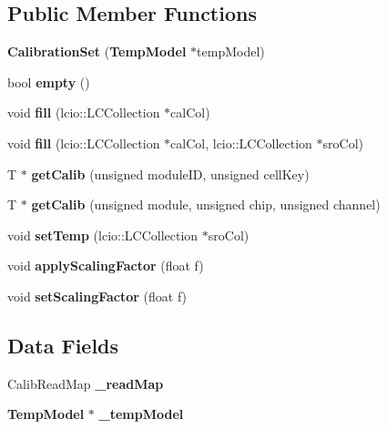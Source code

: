 \subsection*{Public Member Functions}
\begin{DoxyCompactItemize}
\item 
{\bfseries Calibration\-Set} ({\bf Temp\-Model} $\ast$temp\-Model)\label{classCALICE_1_1CalibrationSet_a5b3dc2a9fee4bb05ead1f6aecb63e508}

\item 
bool {\bfseries empty} ()\label{classCALICE_1_1CalibrationSet_acf72ce0c2908ad7c57c1a4fed2e0ae69}

\item 
void {\bfseries fill} (lcio\-::\-L\-C\-Collection $\ast$cal\-Col)\label{classCALICE_1_1CalibrationSet_af6eada4b282e59cd26830121ffe431ad}

\item 
void {\bfseries fill} (lcio\-::\-L\-C\-Collection $\ast$cal\-Col, lcio\-::\-L\-C\-Collection $\ast$sro\-Col)\label{classCALICE_1_1CalibrationSet_a5064acda09ac4e6f60dfd8c95575bb77}

\item 
T $\ast$ {\bfseries get\-Calib} (unsigned module\-I\-D, unsigned cell\-Key)\label{classCALICE_1_1CalibrationSet_ab7ccb1fe35ac7634ea52412ae96da4e5}

\item 
T $\ast$ {\bfseries get\-Calib} (unsigned module, unsigned chip, unsigned channel)\label{classCALICE_1_1CalibrationSet_a0e439372aeaa7d78b6fbcf0886022f1e}

\item 
void {\bfseries set\-Temp} (lcio\-::\-L\-C\-Collection $\ast$sro\-Col)\label{classCALICE_1_1CalibrationSet_a5dcbfc885e768814df5ffb3309173322}

\item 
void {\bfseries apply\-Scaling\-Factor} (float f)\label{classCALICE_1_1CalibrationSet_aba2e28745da6330c981810dd5e21f0ae}

\item 
void {\bfseries set\-Scaling\-Factor} (float f)\label{classCALICE_1_1CalibrationSet_aefc2753764d779cd34362c8a5f8b6943}

\end{DoxyCompactItemize}
\subsection*{Data Fields}
\begin{DoxyCompactItemize}
\item 
Calib\-Read\-Map {\bfseries \-\_\-read\-Map}\label{classCALICE_1_1CalibrationSet_a57c533ff2868f73cf2029d32568b3e20}

\item 
{\bf Temp\-Model} $\ast$ {\bfseries \-\_\-temp\-Model}\label{classCALICE_1_1CalibrationSet_a1076b184fc1d2ae4bb05f204fbe07f34}

\end{DoxyCompactItemize}
